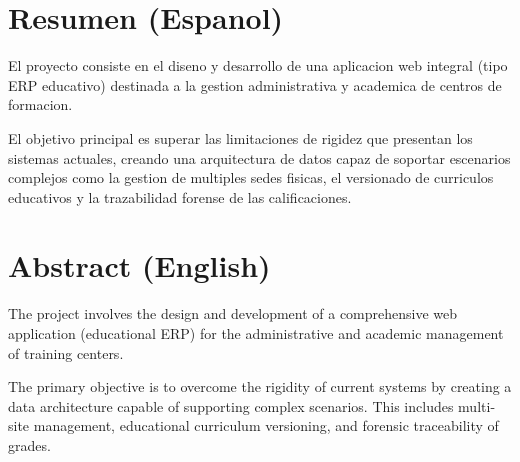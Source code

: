 \section*{Resumen (Espanol)}
El proyecto consiste en el diseno y desarrollo de una aplicacion web integral (tipo ERP educativo) destinada a la gestion administrativa y academica de centros de formacion.

El objetivo principal es superar las limitaciones de rigidez que presentan los sistemas actuales, creando una arquitectura de datos capaz de soportar escenarios complejos como la gestion de multiples sedes fisicas, el versionado de curriculos educativos y la trazabilidad forense de las calificaciones.

\section*{Abstract (English)}
The project involves the design and development of a comprehensive web application (educational ERP) for the administrative and academic management of training centers.

The primary objective is to overcome the rigidity of current systems by creating a data architecture capable of supporting complex scenarios. This includes multi-site management, educational curriculum versioning, and forensic traceability of grades.
